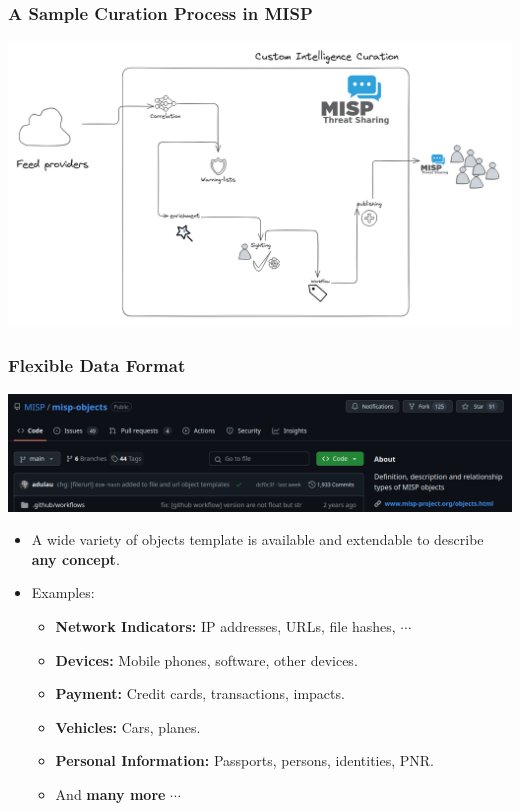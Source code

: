 \begin{frame}
    \frametitle{A Sample Curation Process in MISP}
    \begin{center}
        \includegraphics[width=0.84\linewidth]{curation.png}
    \end{center}
\end{frame}

\begin{frame}
    \frametitle{Flexible Data Format}
    \begin{center}
        \includegraphics[width=0.84\linewidth]{misp-objects-repo.png}
    \end{center}
    \begin{itemize}
        \item A wide variety of objects template is available and extendable to describe \textbf{any concept}.
        \item Examples:
        \begin{itemize}
            \item \textbf{Network Indicators:} IP addresses, URLs, file hashes, $\cdots$
            \item \textbf{Devices:} Mobile phones, software, other devices.
            \item \textbf{Payment:} Credit cards, transactions, impacts.
            \item \textbf{Vehicles:} Cars, planes.
            \item \textbf{Personal Information:} Passports, persons, identities, PNR.
            \item And \textbf{many more} $\cdots$
        \end{itemize}
    \end{itemize}
\end{frame}

